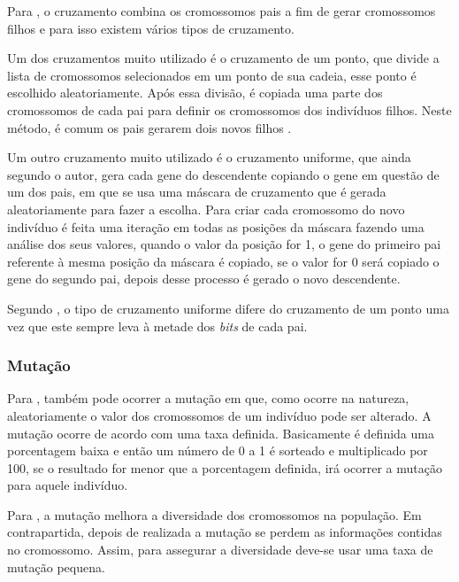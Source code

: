 \par Para , o cruzamento combina
os cromossomos pais a fim de gerar cromossomos filhos e para isso existem vários
tipos de cruzamento.

\par Um dos cruzamentos muito utilizado é o cruzamento de um ponto, que divide a
lista de cromossomos selecionados em um ponto de sua cadeia, esse ponto é escolhido aleatoriamente.
Após essa divisão, é copiada uma parte dos cromossomos de cada pai para definir
os cromossomos dos indivíduos filhos. Neste método, é comum os pais gerarem dois
novos filhos \cite{REVISTA_MULTIDISCIPLINAR_DA_UNIESP}.

\par Um outro cruzamento muito utilizado é o cruzamento uniforme, que
ainda segundo o autor, gera cada gene do descendente copiando o gene em questão
de um dos pais, em que se usa uma máscara de cruzamento que é gerada aleatoriamente para fazer a escolha.
Para criar cada cromossomo do novo indivíduo é feita uma iteração em todas as
posições da máscara fazendo uma análise dos seus valores, quando o valor da posição for 1, o gene do
primeiro pai referente à mesma posição da máscara é copiado, se o valor for 0
será copiado o gene do segundo pai, depois desse processo é gerado o novo
descendente.

\par Segundo , o tipo de cruzamento
uniforme difere do cruzamento de um ponto uma vez que este sempre leva à
metade dos \textit{bits} de cada pai.

\subsubsection{Mutação}

\par Para , também pode ocorrer a mutação em
que, como ocorre na natureza, aleatoriamente o valor dos
cromossomos de um indivíduo pode ser alterado. A mutação ocorre de acordo com
uma taxa definida. Basicamente é definida uma porcentagem baixa e então um
número de 0 a 1 é sorteado e multiplicado por 100, se o resultado for menor que
a porcentagem definida, irá ocorrer a mutação para aquele indivíduo.

\par Para , a mutação melhora a
diversidade dos cromossomos na população. Em contrapartida, depois de realizada
a mutação se perdem as informações contidas no cromossomo. Assim, para assegurar
a diversidade deve-se usar uma taxa de mutação pequena. 


